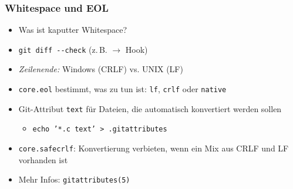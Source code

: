 \documentclass{beamer}
\begin{document}
\begin{frame}
 \frametitle{Whitespace und EOL}

\begin{itemize}
	\item Was ist kaputter Whitespace?
	\item \texttt{git diff -{}-check} (z.\,B. $\rightarrow$ Hook)
\end{itemize}

\begin{itemize}
	\item \emph{Zeilenende:} Windows (CRLF) vs. UNIX (LF)
	\item \texttt{core.eol} bestimmt, was zu tun ist: \texttt{lf}, \texttt{crlf} oder \texttt{native}
	\item Git-Attribut \texttt{text} für Dateien, die automatisch konvertiert werden sollen
\begin{itemize}
	\item \texttt{echo '*.c text' > .gitattributes}
\end{itemize}
	\item \texttt{core.safecrlf}: Konvertierung verbieten, wenn ein Mix aus CRLF und LF vorhanden ist
	\item Mehr Infos: \texttt{gitattributes(5)}
\end{itemize}
 \end{frame}
\end{document}
